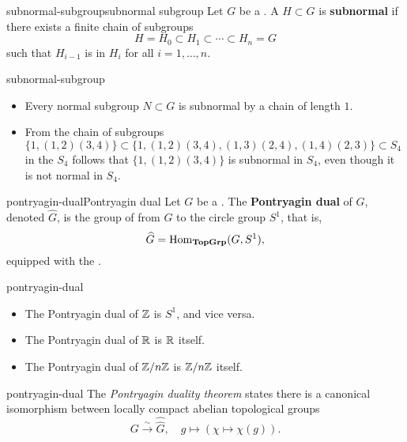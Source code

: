 \begin{topic}{subnormal-subgroup}{subnormal subgroup}
    Let $G$ be a . A  $H \subset G$ is \textbf{subnormal} if there exists a finite chain of subgroups
    \[ H = H_0 \subset H_1 \subset \cdots \subset H_n = G \]
    such that $H_{i - 1}$ is  in $H_i$ for all $i = 1, \ldots, n$.
\end{topic}

\begin{example}{subnormal-subgroup}
    \begin{itemize}
        \item Every normal subgroup $N \subset G$ is subnormal by a chain of length $1$.
        \item From the chain of subgroups $\{ 1, (1, 2) (3, 4) \} \subset \{ 1, (1, 2) (3, 4), (1, 3) (2, 4), (1, 4) (2, 3) \} \subset S_4$ in the  $S_4$ follows that $\{ 1, (1, 2)(3, 4) \}$ is subnormal in $S_4$, even though it is not normal in $S_4$.
    \end{itemize}
\end{example}

\begin{topic}{pontryagin-dual}{Pontryagin dual}
    Let $G$ be a   . The \textbf{Pontryagin dual} of $G$, denoted $\widehat{G}$, is the group of   from $G$ to the circle group $S^1$, that is,
    \[ \widehat{G} = \operatorname{Hom}_\textbf{TopGrp}(G, S^1) , \]
    equipped with the .
\end{topic}

\begin{example}{pontryagin-dual}
    \begin{itemize}
        \item The Pontryagin dual of $\mathbb{Z}$ is $S^1$, and vice versa.
        \item The Pontryagin dual of $\mathbb{R}$ is $\mathbb{R}$ itself.
        \item The Pontryagin dual of $\mathbb{Z}/n\mathbb{Z}$ is $\mathbb{Z}/n\mathbb{Z}$ itself.
    \end{itemize}
\end{example}

\begin{example}{pontryagin-dual}
    The \textit{Pontryagin duality theorem} states there is a canonical isomorphism between locally compact abelian topological groups
    \[ G \xrightarrow{\sim} \widehat{\widehat{G}}, \quad g \mapsto (\chi \mapsto \chi(g)) . \]
\end{example}

